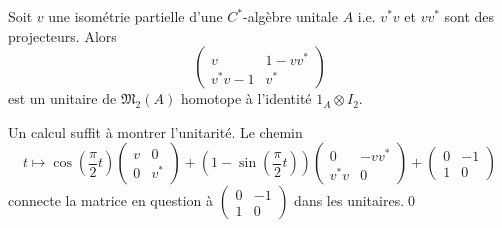 \begin{lem} Soit $v$ une isométrie partielle d'une $C^*$-algèbre unitale $A$ i.e. $v^* v $ et $vv^*$ sont des projecteurs. Alors 
\[\begin{pmatrix}v & 1-vv^* \\ v^*v-1 & v^*\end{pmatrix}\]
est un unitaire de $\mathfrak M_2(A)$ homotope à l'identité $1_{A}\otimes I_2 $.
\end{lem}
\begin{dem}Un calcul suffit à montrer l'unitarité. Le chemin
\[t\mapsto \cos(\frac{\pi}{2} t)\begin{pmatrix}v & 0 \\ 0 & v^*\end{pmatrix} + (1-\sin(\frac{\pi}{2}t))\begin{pmatrix}0 & -vv^* \\ v^*v & 0\end{pmatrix}+\begin{pmatrix} 0 & -1 \\ 1 & 0 \end{pmatrix}\]
connecte la matrice en question à $\begin{pmatrix} 0 & -1 \\ 1 & 0 \end{pmatrix}$ dans les unitaires.\qed
\end{dem}

